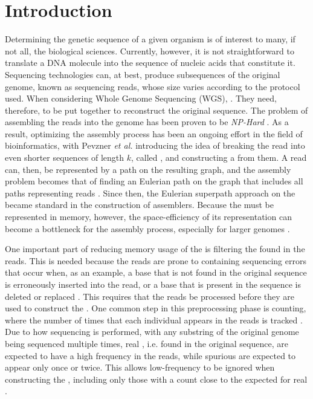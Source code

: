\chapter{Introduction}

Determining the genetic sequence of a given organism is of interest to many, if not all, the biological sciences.  Currently, however, it is not straightforward to translate a DNA molecule into the sequence of nucleic acids that constitute it. Sequencing technologies can, at best, produce subsequences of the original genome, known as sequencing reads, whose size varies according to the protocol used. When considering Whole Genome Sequencing (WGS),   \cite{Miller2010}. They need, therefore, to be put together to reconstruct the original sequence. The problem of assembling the reads into the genome has been proven to be \emph{NP-Hard} \cite{Medvedev2007}. As a result, optimizing the assembly process has been an ongoing effort in the field of bioinformatics, with Pevzner \emph{et al.} introducing the idea of breaking the read into even shorter sequences of length $k$, called , and constructing a \dBG from them. A read can, then, be represented by a path on the resulting graph, and the assembly problem becomes that of finding an Eulerian path on the graph that includes all paths representing reads \cite{Pevzner2001}. Since then, the Eulerian superpath approach on the \dBG became standard in the construction of assemblers. Because the \dBG must be represented in memory, however, the space-efficiency of its representation can become a bottleneck for the assembly process, especially for larger genomes \cite{Chikhi2014}.

One important part of reducing memory usage of the \dBG is filtering the  found in the reads. This is needed because the reads are prone to containing sequencing errors that occur when, as an example, a base that is not found in the original sequence is erroneously inserted into the read, or a base that is present in the sequence is deleted or replaced \cite{Giani2020}. This requires that the reads be processed before they are used to construct the \dBG. One common step in this preprocessing phase is \kmer counting, where the number of times that each individual \kmer appears in the reads is tracked \cite{Zhang2014}. Due to how sequencing is performed, with any substring of the original genome being sequenced multiple times, real , i.e.  found in the original sequence, are expected to have a high frequency in the reads, while spurious  are expected to appear only once or twice. This allows low-frequency  to be ignored when constructing the \dBG, including only those with a count close to the expected for real  \cite{Conway2011}\cite{Ghosh2019}.

